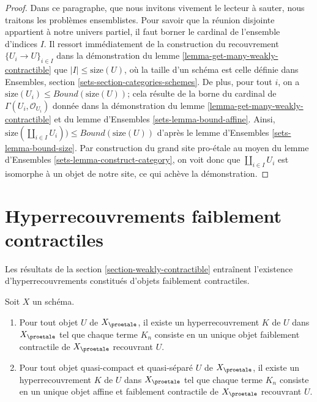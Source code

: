 \begin{proof}
\medskip\noindent
Dans ce paragraphe, que nous invitons vivement le lecteur à sauter, nous traitons
les problèmes ensemblistes. Pour savoir que la réunion disjointe
appartient à notre univers partiel, il faut borner le cardinal de
l'ensemble d'indices $I$. Il ressort immédiatement de la construction du
recouvrement $\{U_i \to U\}_{i \in I}$ dans la démonstration du
lemme \ref{lemma-get-many-weakly-contractible}
que $|I| \leq \text{size}(U)$, où la taille d'un schéma est celle
définie dans Ensembles, section \ref{sets-section-categories-schemes}.
De plus, pour tout $i$, on a
$\text{size}(U_i) \leq Bound(\text{size}(U))$;
cela résulte de la borne du cardinal de
$\Gamma(U_i, \mathcal{O}_{U_i})$ donnée dans
la démonstration du lemme \ref{lemma-get-many-weakly-contractible}
et du lemme d'Ensembles \ref{sets-lemma-bound-affine}.
Ainsi, $\text{size}(\coprod_{i \in I} U_i)) \leq Bound(\text{size}(U))$
d'après le lemme d'Ensembles \ref{sets-lemma-bound-size}.
Par construction du grand site pro-\'etale au moyen du
lemme d'Ensembles \ref{sets-lemma-construct-category},
on voit donc que $\coprod_{i \in I} U_i$ est isomorphe à un objet
de notre site, ce qui achève la démonstration.
\end{proof}






\section{Hyperrecouvrements faiblement contractiles}
\label{section-hypercovering}

\noindent
Les résultats de la section \ref{section-weakly-contractible}
entraînent l'existence d'hyperrecouvrements constitués d'objets
faiblement contractiles.

\begin{lemma}
\label{lemma-w-contractible-hypercovering}
Soit $X$ un schéma.
\begin{enumerate}
\item Pour tout objet $U$ de $X_\proetale$, il existe un hyperrecouvrement
$K$ de $U$ dans $X_\proetale$ tel que chaque terme $K_n$ consiste en un
unique objet faiblement contractile de $X_\proetale$ recouvrant $U$.
\item Pour tout objet quasi-compact et quasi-séparé $U$ de $X_\proetale$,
il existe un hyperrecouvrement $K$ de $U$ dans $X_\proetale$ tel que chaque
terme $K_n$ consiste en un unique objet affine et faiblement contractile de
$X_\proetale$ recouvrant $U$.
\end{enumerate}
\end{lemma}

